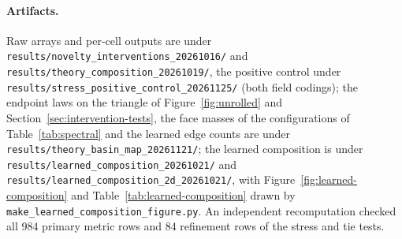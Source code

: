 \documentclass{article} %
\newcommand{\iclrallow}{\allowbreak}
\theoremstyle{plain}
\theoremstyle{definition}
\theoremstyle{remark}
\begin{document}
\begingroup\raggedright
\paragraph{Artifacts.} Raw arrays and per-cell outputs are under
\texttt{results/\iclrallow novelty\_interventions\_20261016/} and
\texttt{results/\iclrallow theory\_composition\_20261019/}, the positive control under
\texttt{results/\iclrallow stress\_positive\_control\_20261125/} (both field codings); the endpoint laws on the triangle of
Figure~\ref{fig:unrolled} and Section~\ref{sec:intervention-tests}, the face masses of the
configurations of Table~\ref{tab:spectral} and the learned edge counts are under
\texttt{results/\iclrallow theory\_basin\_map\_20261121/}; the learned composition is under
\texttt{results/\iclrallow learned\_composition\_20261021/} and
\texttt{results/\iclrallow learned\_composition\_2d\_20261021/}, with
Figure~\ref{fig:learned-composition} and Table~\ref{tab:learned-composition} drawn by
\texttt{make\_learned\_composition\_figure.py}. An independent recomputation checked all 984
primary metric rows and 84 refinement rows of the stress and tie tests.\par\endgroup
\end{document}
